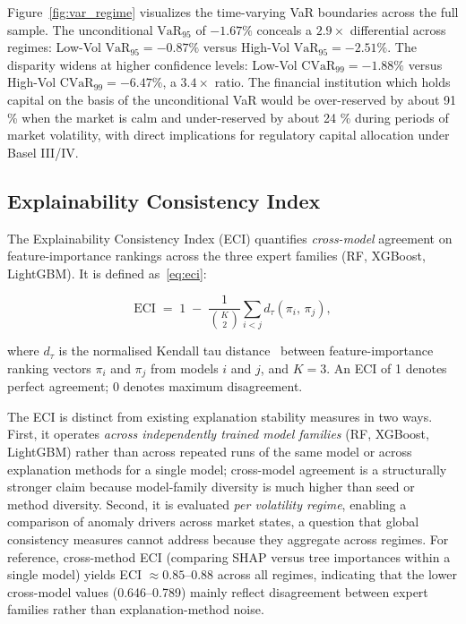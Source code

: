 \documentclass[]{interact}
\begin{document}
Figure~\ref{fig:var_regime} visualizes the time-varying VaR boundaries across the full sample. The unconditional $\text{VaR}_{95}$ of $-1.67\%$ conceals a $2.9\times$ differential across regimes: Low-Vol $\text{VaR}_{95} = -0.87\%$ versus High-Vol $\text{VaR}_{95} = -2.51\%$. The disparity widens at higher confidence levels: Low-Vol $\text{CVaR}_{99} = -1.88\%$ versus High-Vol $\text{CVaR}_{99} = -6.47\%$, a $3.4\times$ ratio. The financial institution which holds capital on the basis of the unconditional VaR would be over-reserved by about 91 \% when the market is calm and under-reserved by about 24 \% during periods of market volatility, with direct implications for regulatory capital allocation under Basel III/IV.

\subsection{Explainability Consistency Index}
\label{subsec:eci}

The Explainability Consistency Index (ECI) quantifies \emph{cross-model} agreement on feature-importance rankings across the three expert families (RF, XGBoost, LightGBM). It is defined as~\eqref{eq:eci}:

\begin{equation}
  \mathrm{ECI} \;=\; 1 \;-\; \frac{1}{\binom{K}{2}}
  \sum_{i < j} d_{\tau}(\pi_i,\, \pi_j),
  \label{eq:eci}
\end{equation}

\noindent where $d_{\tau}$ is the normalised Kendall tau distance~\citep{kendall1938measure} between feature-importance ranking vectors $\pi_i$ and $\pi_j$ from models $i$ and $j$, and $K = 3$. An ECI of 1 denotes perfect agreement; 0 denotes maximum disagreement.

The ECI is distinct from existing explanation stability measures in two ways. First, it operates \emph{across independently trained model families} (RF, XGBoost, LightGBM) rather than across repeated runs of the same model or across explanation methods for a single model; cross-model agreement is a structurally stronger claim because model-family diversity is much higher than seed or method diversity. Second, it is evaluated \emph{per volatility regime}, enabling a comparison of anomaly drivers across market states, a question that global consistency measures cannot address because they aggregate across regimes. For reference, cross-method ECI (comparing SHAP versus tree importances within a single model) yields ECI $\approx 0.85$--$0.88$ across all regimes, indicating that the lower cross-model values (0.646--0.789) mainly reflect disagreement between expert families rather than explanation-method noise.
\end{document}
